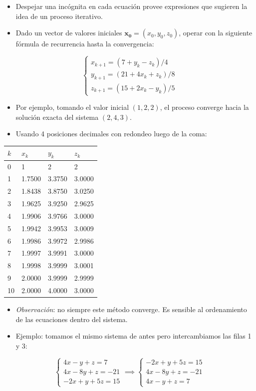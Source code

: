 \documentclass[]{book}
\providecommand{\tightlist}{%
  \setlength{\itemsep}{0pt}\setlength{\parskip}{0pt}}
\begin{document}
\begin{itemize}
\tightlist
\item
  Despejar una incógnita en cada ecuación provee expresiones que sugieren la idea de un proceso iterativo.
\item
  Dado un vector de valores iniciales \(\mathbf{x_0}=(x_0, y_0, z_0)\), operar con la siguiente fórmula de recurrencia hasta la convergencia:
\end{itemize}

\[
\begin{cases} 
x_{k+1}=(7+y_k-z_k)/4 \\
y_{k+1}=(21+4x_k+z_k)/8 \\
z_{k+1}=(15+2x_k-y_k)/5
\end{cases}
\]

\begin{itemize}
\tightlist
\item
  Por ejemplo, tomando el valor inicial \((1, 2, 2)\), el proceso converge hacia la solución exacta del sistema \((2, 4, 3)\).
\item
  Usando 4 posiciones decimales con redondeo luego de la coma:
\end{itemize}

\begin{longtable}[]{@{}llll@{}}
\toprule
\(k\) & \(x_k\) & \(y_k\) & \(z_k\)\tabularnewline
\midrule
\endhead
0 & 1 & 2 & 2\tabularnewline
1 & 1.7500 & 3.3750 & 3.0000\tabularnewline
2 & 1.8438 & 3.8750 & 3.0250\tabularnewline
3 & 1.9625 & 3.9250 & 2.9625\tabularnewline
4 & 1.9906 & 3.9766 & 3.0000\tabularnewline
5 & 1.9942 & 3.9953 & 3.0009\tabularnewline
6 & 1.9986 & 3.9972 & 2.9986\tabularnewline
7 & 1.9997 & 3.9991 & 3.0000\tabularnewline
8 & 1.9998 & 3.9999 & 3.0001\tabularnewline
9 & 2.0000 & 3.9999 & 2.9999\tabularnewline
10 & 2.0000 & 4.0000 & 3.0000\tabularnewline
\bottomrule
\end{longtable}

\begin{itemize}
\tightlist
\item
  \emph{Observación}: no siempre este método converge. Es sensible al ordenamiento de las ecuaciones dentro del sistema.
\item
  Ejemplo: tomamos el mismo sistema de antes pero intercambiamos las filas 1 y 3:
\end{itemize}

\[
\begin{cases} 
4x-y+z=7 \\
4x-8y+z=-21 \\
-2x+y+5z=15
\end{cases}
\implies
\begin{cases} 
-2x+y+5z=15 \\
4x-8y+z=-21 \\
4x-y+z=7
\end{cases}
\]
\end{document}
